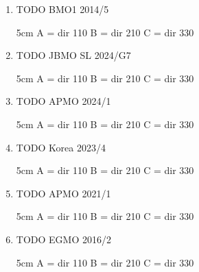 \documentclass[11pt,paper=letter]{scrartcl}
\begin{document}
\begin{enumerate}
\item TODO BMO1 2014/5
\begin{center}
\begin{tsqx}{5cm}
A = dir 110
B = dir 210
C = dir 330
\end{tsqx}
\end{center}

\item TODO JBMO SL 2024/G7
\begin{center}
\begin{tsqx}{5cm}
A = dir 110
B = dir 210
C = dir 330
\end{tsqx}
\end{center}

\item TODO APMO 2024/1
\begin{center}
\begin{tsqx}{5cm}
A = dir 110
B = dir 210
C = dir 330
\end{tsqx}
\end{center}

\item TODO Korea 2023/4
\begin{center}
\begin{tsqx}{5cm}
A = dir 110
B = dir 210
C = dir 330
\end{tsqx}
\end{center}

\item TODO APMO 2021/1
\begin{center}
\begin{tsqx}{5cm}
A = dir 110
B = dir 210
C = dir 330
\end{tsqx}
\end{center}

\item TODO EGMO 2016/2
\begin{center}
\begin{tsqx}{5cm}
A = dir 110
B = dir 210
C = dir 330
\end{tsqx}
\end{center}

\end{enumerate}
\end{document}
